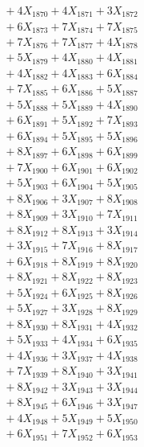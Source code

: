 \documentclass[a4paper,10pt]{article}
\begin{document}
{\begin{align}
&\;  + 4 X_{1870} + 4 X_{1871} + 3 X_{1872} \\[0.3ex]
&\;  + 6 X_{1873} + 7 X_{1874} + 7 X_{1875} \\[0.3ex]
&\;  + 7 X_{1876} + 7 X_{1877} + 4 X_{1878} \\[0.3ex]
&\;  + 5 X_{1879} + 4 X_{1880} + 4 X_{1881} \\[0.3ex]
&\;  + 4 X_{1882} + 4 X_{1883} + 6 X_{1884} \\[0.3ex]
&\;  + 7 X_{1885} + 6 X_{1886} + 5 X_{1887} \\[0.3ex]
&\;  + 5 X_{1888} + 5 X_{1889} + 4 X_{1890} \\[0.3ex]
&\;  + 6 X_{1891} + 5 X_{1892} + 7 X_{1893} \\[0.3ex]
&\;  + 6 X_{1894} + 5 X_{1895} + 5 X_{1896} \\[0.3ex]
&\;  + 8 X_{1897} + 6 X_{1898} + 6 X_{1899} \\[0.5ex]\allowbreak
&\;  + 7 X_{1900} + 6 X_{1901} + 6 X_{1902} \\[0.3ex]
&\;  + 5 X_{1903} + 6 X_{1904} + 5 X_{1905} \\[0.3ex]
&\;  + 8 X_{1906} + 3 X_{1907} + 8 X_{1908} \\[0.3ex]
&\;  + 8 X_{1909} + 3 X_{1910} + 7 X_{1911} \\[0.3ex]
&\;  + 8 X_{1912} + 8 X_{1913} + 3 X_{1914} \\[0.3ex]
&\;  + 3 X_{1915} + 7 X_{1916} + 8 X_{1917} \\[0.3ex]
&\;  + 6 X_{1918} + 8 X_{1919} + 8 X_{1920} \\[0.3ex]
&\;  + 8 X_{1921} + 8 X_{1922} + 8 X_{1923} \\[0.3ex]
&\;  + 5 X_{1924} + 6 X_{1925} + 8 X_{1926} \\[0.3ex]
&\;  + 5 X_{1927} + 3 X_{1928} + 8 X_{1929} \\[0.5ex]\allowbreak
&\;  + 8 X_{1930} + 8 X_{1931} + 4 X_{1932} \\[0.3ex]
&\;  + 5 X_{1933} + 4 X_{1934} + 6 X_{1935} \\[0.3ex]
&\;  + 4 X_{1936} + 3 X_{1937} + 4 X_{1938} \\[0.3ex]
&\;  + 7 X_{1939} + 8 X_{1940} + 3 X_{1941} \\[0.3ex]
&\;  + 8 X_{1942} + 3 X_{1943} + 3 X_{1944} \\[0.3ex]
&\;  + 8 X_{1945} + 6 X_{1946} + 3 X_{1947} \\[0.3ex]
&\;  + 4 X_{1948} + 5 X_{1949} + 5 X_{1950} \\[0.3ex]
&\;  + 6 X_{1951} + 7 X_{1952} + 6 X_{1953} \\[0.3ex]

\end{align}}
\end{document}
